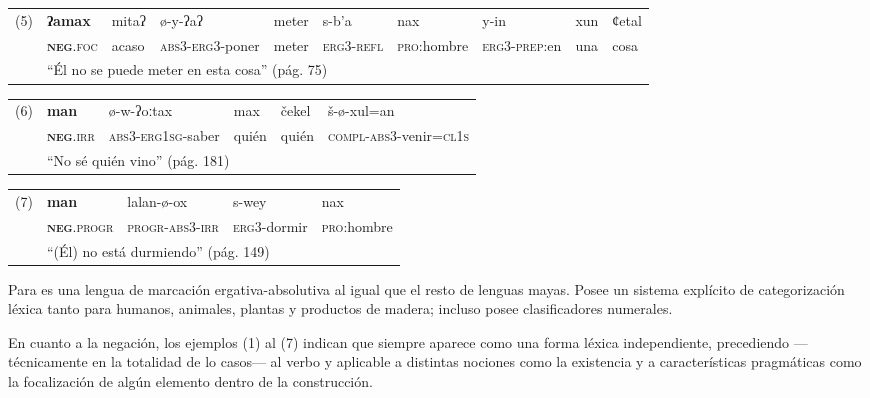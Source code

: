 {%
{\footnotesize
\noindent \begin{tabular}{llllllllll}
(5) & \textbf{ʔamax} & mitaʔ & ø-y-ʔaʔ & meter & s-b'a & nax & y-in & xun & ȼetal \\
& \textsc{\textbf{neg}.foc}  & acaso & \textsc{abs3-erg3}-poner & meter & \textsc{erg3-refl} & \textsc{pro}:hombre & \textsc{erg3-prep}:en & una & cosa \\
& \multicolumn{9}{l}{“Él no se puede meter en esta cosa” (pág. 75)}                                                         
\end{tabular} \vspace{0.25cm}
}

\noindent \begin{tabular}{llllll}
(6) & \textbf{man} & ø-w-ʔoːtax & max & čekel & š-ø-xul=an \\
& \textsc{\textbf{neg}.irr} & \textsc{abs3-erg1sg}-saber & quién & quién & \textsc{compl-abs3}-venir=\textsc{cl1s} \\
& \multicolumn{5}{l}{“No sé quién vino” (pág. 181)}                       
\end{tabular} \vspace{0.25cm}

\noindent \begin{tabular}{lllll}
(7) & \textbf{man} & lalan-ø-ox & s-wey & nax \\
& \textsc{\textbf{neg}.progr} & \textsc{progr-abs3-irr} & \textsc{erg3}-dormir & \textsc{pro}:hombre \\
& \multicolumn{4}{l}{“(Él) no está durmiendo” (pág. 149)}        
\end{tabular} \vspace{0.3cm}

}

Para \textcolor{MidnightBlue}{
\citet{acateco}} es una lengua de marcación ergativa-absolutiva al igual que el resto de lenguas mayas. Posee un sistema explícito de categorización léxica tanto para humanos, animales, plantas y productos de madera; incluso posee clasificadores numerales.

En cuanto a la negación, los ejemplos (1) al (7) indican que siempre aparece como una forma léxica independiente, precediendo —técnicamente en la totalidad de lo casos— al verbo y aplicable a distintas nociones como la existencia y a características pragmáticas como la focalización de algún elemento dentro de la construcción.